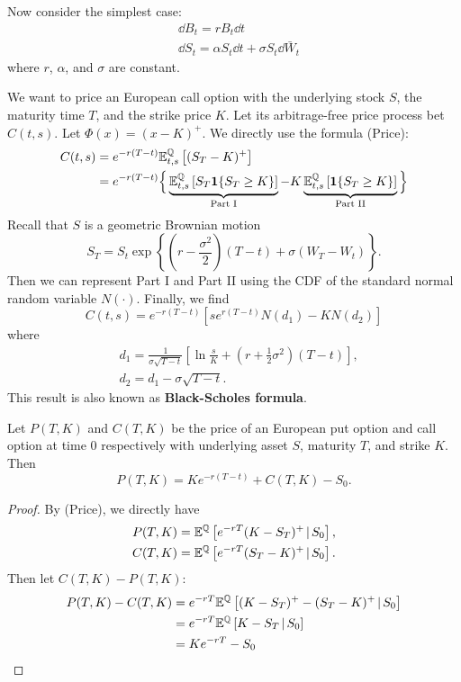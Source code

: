  
\begin{example}
	Now consider the simplest case:
	\begin{align*}
	&\dd B_t = rB_t \dd t  \\ 
	& \dd S_t = \alpha S_t \dd t + \sigma S_t \dd \bar{W}_t 
	\end{align*}
	where $r$, $\alpha$, and $\sigma$ are constant.
	
	We want to price an European call option with the underlying stock $S$, the maturity time $T$, and the strike price $K$.  Let its arbitrage-free price process bet $C(t,s)$. Let $\Phi(x) = (x- K)^+$. We directly use the formula (Price):
	\begin{align*}
		C(t,s) &= e^{-r(T-t)}\mathbb{E}^{\mathbb{Q}}_{t,s} \left[  ( S_T - K )^+ \right] \\
			&= e^{-r(T-t)} \Big\{ \underbrace{\mathbb{E}^{\mathbb{Q}}_{t,s}  \left[  S_T \boldsymbol{1}\{ S_T \geq K \} \right]}_{\text{Part I}} -  K \underbrace{\mathbb{E}^{\mathbb{Q}}_{t,s} \left[  \boldsymbol{1}\{ S_T \geq K \} \right]}_{\text{Part II}}  \Big\}
	\end{align*}
	Recall that $S$ is a geometric Brownian motion 
	$$S_T = S_t \exp\left\{ ( r - \frac{\sigma^2}{2} )(T-t) + \sigma(W_T - W_t) \right\}.$$
	Then we can represent Part I and Part II using the CDF of the standard normal random variable $N(\cdot)$. Finally, we find
	$$C(t,s) = e^{-r(T-t)} \left[se^{r(T-t)}N(d_1) -  K N(d_2)\right]$$
	where
	\begin{align*}
		& d_1 =  \frac{1}{ \sigma \sqrt{T-t} } \left[  \ln\frac{s}{K} + (r + \frac{1}{2}\sigma^2)(T-t)   \right], \\
		& d_2 = d_1 - \sigma \sqrt{ T - t }.
	\end{align*}
	This result is also known as \textbf{Black-Scholes formula}.
\end{example}

\begin{thm}
	Let $P(T,K)$ and $C(T,K)$ be the price of an European put option and call option at time $0$ respectively with underlying asset $S$, maturity $T$, and strike $K$. Then
	$$P(T,K) = Ke^{-r(T-t)} + C(T,K) - S_0.$$
\end{thm}
\begin{proof}
	By (Price), we directly have
	\begin{align*}
		P(T,K) &= \mathbb{E}^{\mathbb{Q}} \left[  e^{-rT} (K - S_T)^+ \hspace{1.5pt} | \hspace{1.5pt} S_0 \right], \\
		C(T,K) &= \mathbb{E}^{\mathbb{Q}} \left[  e^{-rT} (S_T - K)^+ \hspace{1.5pt} | \hspace{1.5pt} S_0 \right].
	\end{align*}
	Then let $C(T, K) - P(T,K)$:
	\begin{align*}
		P(T,K) - C(T, K)&= e^{-rT}\mathbb{E}^{\mathbb{Q}}\left[  (K - S_T)^+ - (S_T - K)^+ \hspace{1.5pt} | \hspace{1.5pt} S_0    \right] \\
		&= e^{-rT}\mathbb{E}^{\mathbb{Q}}\left[  K - S_T \hspace{1.5pt} | \hspace{1.5pt} S_0  \right]  \\
		&= Ke^{-rT} - S_0
	\end{align*} 
\end{proof}

